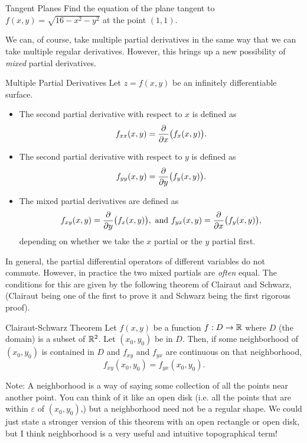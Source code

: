 \begin{exercise}{Tangent Planes}
Find the equation of the plane tangent to $f(x,y)=\sqrt{16-x^2-y^2}$ at the point $(1,1)$.
\end{exercise}

We can, of course, take multiple partial derivatives in the same way that we can take multiple regular derivatives. However, this brings up a new possibility of \textit{mixed} partial derivatives.

\begin{definition}{Multiple Partial Derivatives}
Let $z=f(x,y)$ be an infinitely differentiable surface.
\vspace{1em}
\begin{itemize}
\item The second partial derivative with respect to $x$ is defined as $$f_{xx}(x,y)=\frac{\partial }{\partial x}\big(f_x(x,y)\big). $$
\item The second partial derivative with respect to $y$ is defined as $$f_{yy}(x,y)=\frac{\partial }{\partial y}\big(f_y(x,y)\big). $$
\item The mixed partial derivatives are defined as
$$f_{xy}(x,y)=\frac{\partial }{\partial y}\big(f_x(x,y)\big),\text{ and }f_{yx}(x,y)=\frac{\partial }{\partial x}\big(f_y(x,y)\big),$$ depending on whether we take the $x$ partial or the $y$ partial first.
\end{itemize}
\end{definition}

In general, the partial differential operators of different variables do not commute. However, in practice the two mixed partials are \textit{often} equal. The conditions for this are given by the following theorem of Clairaut and Schwarz,
 (Clairaut being one of the first to prove it and Schwarz being the first rigorous proof).
 
 \begin{theorem}{\hypertarget{cs}{Clairaut-Schwarz Theorem}}
Let $f(x,y)$ be a function $f:D\to\mathbb{R}$ where $D$ (the domain) is a subset of $\mathbb{R}^2$. Let $(x_0,y_0)$ be in $D$. Then, if some neighborhood of $(x_0,y_0)$ is contained in $D$ and $f_{xy}$ and $f_{yx}$ are continuous on that neighborhood, $$f_{xy}(x_0,y_0)=f_{yx}(x_0,y_0). $$
 \end{theorem}

 Note: A neighborhood is a way of saying some collection of all the points near another point. You can think of it like an open disk (i.e. all the points that are within $\varepsilon$ of $(x_0,y_0)$,) but a neighborhood need not be a regular shape. We could just state a stronger version of this theorem with an open rectangle or open disk, but I think neighborhood is a very useful and intuitive topographical term!
 
